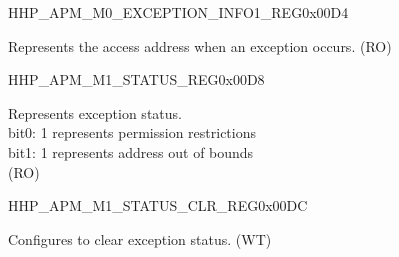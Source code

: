 \begin{register}{H}{HP\_APM\_M0\_EXCEPTION\_INFO1\_REG}{0x00D4}\label{regdesc:HPAPMM0EXCEPTIONINFO1REG}
%
\regnewline%
\begin{regdesc}\begin{reglist}
\label{fielddesc:HPAPMM0EXCEPTIONADDR}\item [HP\_APM\_M0\_EXCEPTION\_ADDR] Represents the access address when an exception occurs. (RO)
\end{reglist}\end{regdesc}
\end{register}


\begin{register}{H}{HP\_APM\_M1\_STATUS\_REG}{0x00D8}\label{regdesc:HPAPMM1STATUSREG}
%
%
\regnewline%
\begin{regdesc}\begin{reglist}
\label{fielddesc:HPAPMM1EXCEPTIONSTATUS}\item [HP\_APM\_M1\_EXCEPTION\_STATUS] Represents exception status.\\ 
bit0: 1 represents permission restrictions \\ 
bit1: 1 represents address out of bounds  \\ (RO)
\end{reglist}\end{regdesc}
\end{register}


\begin{register}{H}{HP\_APM\_M1\_STATUS\_CLR\_REG}{0x00DC}\label{regdesc:HPAPMM1STATUSCLRREG}
%
%
\regnewline%
\begin{regdesc}\begin{reglist}
\label{fielddesc:HPAPMM1EXCEPTIONSTATUSCLR}\item [HP\_APM\_M1\_EXCEPTION\_STATUS\_CLR] Configures to clear exception status. (WT)
\end{reglist}\end{regdesc}
\end{register}


